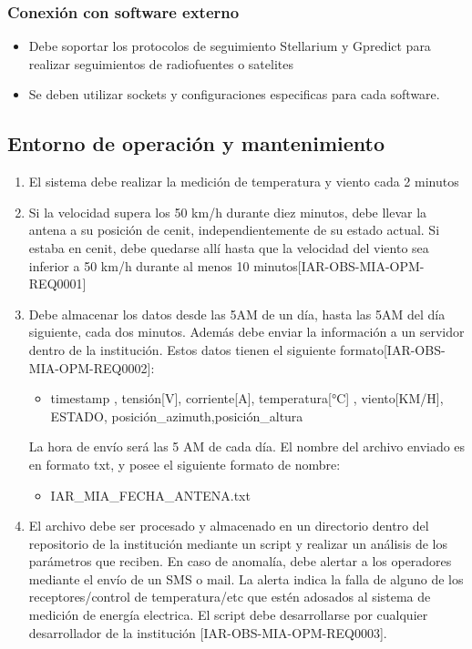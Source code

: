 \documentclass[12pt,a4paper, twosite]{article}
\begin{document}
\subsubsection{Conexión con software externo}
	\begin{itemize}
		\item Debe soportar los protocolos de seguimiento Stellarium y Gpredict para realizar seguimientos de radiofuentes o satelites
		\item Se deben utilizar sockets y configuraciones especificas para cada software. 
	\end{itemize}

\subsection{Entorno de operación y mantenimiento}
\begin{enumerate}
	\item El sistema debe realizar la medición de temperatura y viento cada 2 minutos 
	\item Si la velocidad supera los 50 km/h durante diez minutos, debe llevar la antena a su posición de cenit, independientemente de su estado actual. Si estaba en cenit, debe quedarse allí hasta que la velocidad del viento sea inferior a 50 km/h durante al menos 10 minutos[IAR-OBS-MIA-OPM-REQ0001]
	\item Debe almacenar los datos desde las 5AM de un día, hasta las 5AM del día siguiente, cada dos minutos. Además debe enviar la información a un servidor dentro de la institución. Estos datos tienen el siguiente formato[IAR-OBS-MIA-OPM-REQ0002]: 
	\begin{itemize}
		\item timestamp , tensión[V], corriente[A], temperatura[°C] , viento[KM/H], ESTADO, posición\_azimuth,posición\_altura 
	\end{itemize}  
	La hora de envío será las 5 AM de cada día. El nombre del archivo enviado es en formato txt, y posee el siguiente formato de nombre: 
	\begin{itemize}
		\item IAR\_MIA\_FECHA\_ANTENA.txt 
	\end{itemize} 
	\item El archivo debe ser procesado y almacenado en un directorio dentro del repositorio de la institución mediante un script y realizar un análisis de los parámetros que reciben. En caso de anomalía, debe alertar a los operadores mediante el envío de un SMS o mail.  La alerta indica la falla de alguno de los receptores/control de temperatura/etc que estén adosados al sistema de medición de energía electrica. El script debe desarrollarse por cualquier desarrollador de la institución [IAR-OBS-MIA-OPM-REQ0003].
\end{enumerate}
\end{document}
